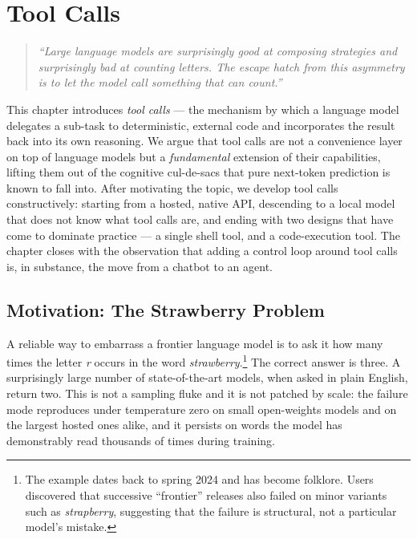 
\chapter{Tool Calls}
\label{ch:toolcalls}

\begin{quote}
\itshape
\small
``Large language models are surprisingly good at composing strategies
and surprisingly bad at counting letters. The escape hatch from this
asymmetry is to let the model \emph{call} something that can count.''
\end{quote}

\noindent
This chapter introduces \emph{tool calls} --- the mechanism by which a
language model delegates a sub-task to deterministic, external code and
incorporates the result back into its own reasoning. We argue that
tool calls are not a convenience layer on top of language models but a
\emph{fundamental} extension of their capabilities, lifting them out of
the cognitive cul-de-sacs that pure next-token prediction is known to
fall into. After motivating the topic, we develop tool calls
constructively: starting from a hosted, native API, descending to a
local model that does not know what tool calls are, and ending with
two designs that have come to dominate practice --- a single shell
tool, and a code-execution tool. The chapter closes with the
observation that adding a control loop around tool calls is, in
substance, the move from a chatbot to an agent.

\section{Motivation: The Strawberry Problem}
\label{sec:strawberry}

A reliable way to embarrass a frontier language model is to ask it
how many times the letter \emph{r} occurs in the word
\emph{strawberry}.\footnote{The example dates back to spring 2024 and
has become folklore. Users discovered that successive ``frontier''
releases also failed on minor variants such as \emph{strapberry},
suggesting that the failure is structural, not a particular model's
mistake.}
The correct answer is three. A surprisingly large number of
state-of-the-art models, when asked in plain English, return two.
This is not a sampling fluke and it is not patched by scale: the
failure mode reproduces under temperature zero on small open-weights
models and on the largest hosted ones alike, and it persists on
words the model has demonstrably read thousands of times during
training.

